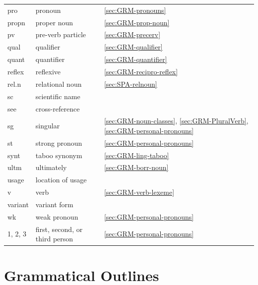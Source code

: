 \begin{table}[h]
\begin{tabular}{lll}
pro    &    pronoun &\ref{sec:GRM-pronouns}\\
propn   &   proper noun &\ref{sec:GRM-prop-noun}\\
pv    &    pre-verb particle &\ref{sec:GRM-precerv}\\
qual    &    qualifier &\ref{sec:GRM-qualifier}\\
quant   &   quantifier &\ref{sec:GRM-quantifier}\\
 reflex   &   reflexive   &\ref{sec:GRM-recipro-reflex}\\ 
rel.n   &    relational noun &\ref{sec:SPA-relnoun}\\
sc& scientific name & \\
see    &   cross-reference & \\
  sg   &   singular & \ref{sec:GRM-noun-classes}, \ref{sec:GRM-PluralVerb}, 
\ref{sec:GRM-personal-pronouns}\\
 st   &   strong pronoun &\ref{sec:GRM-personal-pronouns}\\
synt   &     taboo synonym &\ref{sec:GRM-ling-taboo}\\
 ultm    &    ultimately &\ref{sec:GRM-borr-noun}\\
usage   &    location of usage & \\
    v   &   verb &\ref{sec:GRM-verb-lexeme}\\
variant    &    variant form & \\
 wk   &   weak pronoun &\ref{sec:GRM-personal-pronouns}\\
   1, 2, 3  &    first, second, or third person 
&\ref{sec:GRM-personal-pronouns}\\

\end{tabular}

 \end{table}




\section{Grammatical Outlines}
\label{sec:intro-outline}


